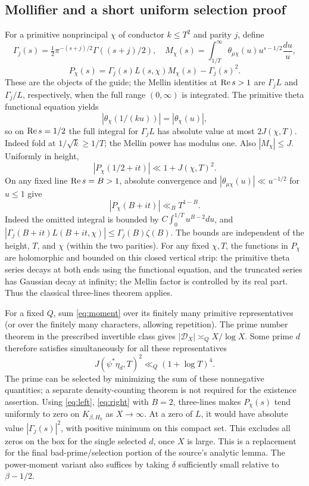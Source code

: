 \documentclass[11pt,a4paper]{article}
\theoremstyle{remark}\newtheorem{remark}[theorem]{Remark}
\begin{document}
\subsection{Mollifier and a short uniform selection proof}
For a primitive nonprincipal $\chi$ of conductor $k\le T^2$ and parity $j$, define
\[\Gamma_j(s)=\tfrac12\pi^{-(s+j)/2}\Gamma((s+j)/2),\quad
M_\chi(s)=\int_{1/T}^\infty \theta_{\mu\chi}(u)u^{s-1/2}\frac{du}{u},\]
\[P_\chi(s)=\Gamma_j(s)L(s,\chi)M_\chi(s)-\Gamma_j(s)^2.\]
These are the objects of the guide; the Mellin identities at $\operatorname{Re} s>1$ are $\Gamma_j L$ and $\Gamma_j/L$, respectively, when the full range $(0,\infty)$ is integrated. The primitive theta functional equation yields
\[|\theta_\chi(1/(ku))|=|\theta_\chi(u)|,\]
so on $\operatorname{Re} s=1/2$ the full integral for $\Gamma_j L$ has absolute value at most $2J(\chi,T)$. Indeed fold at $1/\sqrt k\ge1/T$; the Mellin power has modulus one. Also $|M_\chi|\le J$. Uniformly in height,
\begin{equation}\label{eq:left}|P_\chi(1/2+it)|\ll1+J(\chi,T)^2.\end{equation}
On any fixed line $\operatorname{Re} s=B>1$, absolute convergence and $|\theta_{\mu\chi}(u)|\ll u^{-1/2}$ for $u\le1$ give
\begin{equation}\label{eq:right}|P_\chi(B+it)|\ll_B T^{1-B}.
\end{equation}
Indeed the omitted integral is bounded by $C\int_0^{1/T}u^{B-2}du$, and $|\Gamma_j(B+it)L(B+it,\chi)|\le\Gamma_j(B)\zeta(B)$. The bounds are independent of the height, $T$, and $\chi$ (within the two parities). For any fixed $\chi,T$, the functions in $P_\chi$ are holomorphic and bounded on this closed vertical strip: the primitive theta series decays at both ends using the functional equation, and the truncated series has Gaussian decay at infinity; the Mellin factor is controlled by its real part. Thus the classical three-lines theorem applies.

For a fixed $Q$, sum \eqref{eq:moment} over its finitely many primitive representatives (or over the finitely many characters, allowing repetition). The prime number theorem in the prescribed invertible class gives $|\mathcal D_X|\asymp_Q X/\log X$. Some prime $d$ therefore satisfies simultaneously for all these representatives
\[J(\psi^*\eta_d,T)^2\ll_Q (1+\log T)^4.\]
The prime can be selected by minimizing the sum of these nonnegative quantities; a separate density-counting theorem is not required for the existence assertion. Using \eqref{eq:left}, \eqref{eq:right} with $B=2$, three-lines makes $P_\chi(s)$ tend uniformly to zero on $K_{\beta,H_0}$ as $X\to\infty$. At a zero of $L$, it would have absolute value $|\Gamma_j(s)|^2$, with positive minimum on this compact set. This excludes all zeros on the box for the single selected $d$, once $X$ is large. This is a replacement for the final bad-prime/selection portion of the source's analytic lemma. The power-moment variant also suffices by taking $\delta$ sufficiently small relative to $\beta-1/2$.
\end{document}
